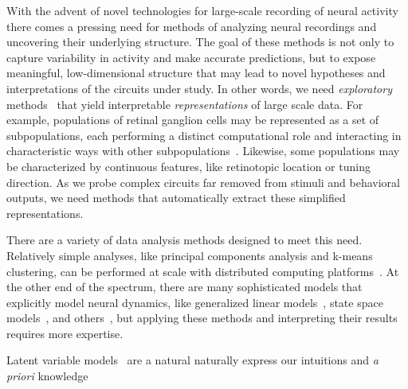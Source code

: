 With the advent of novel technologies for large-scale recording of
neural activity~\cite{grewe2010high, prevedel2014simultaneous,
  churchland2012neural, holekamp2008fast, ahrens2013whole,
  portugues2014whole, alivisatos2012brain, briggman2005optical,
  ahrens2012brain} there comes a pressing need for methods of
analyzing neural recordings and uncovering their underlying structure.
The goal of these methods is not only to capture variability in
activity and make accurate predictions, but to expose meaningful,
low-dimensional structure that may lead to novel hypotheses and
interpretations of the circuits under study. In other words, we
need \emph{exploratory} methods~\cite{tukey1962future} that yield interpretable
\emph{representations} of large scale data.  
For example, populations of retinal ganglion cells may be represented as a 
set of subpopulations, each performing a distinct
computational role and interacting in characteristic ways with
other subpopulations~\cite{sanes2015types}.
Likewise, some populations may be characterized by continuous features,
like retinotopic location or tuning direction.
As we probe complex circuits far removed from stimuli and behavioral
outputs, we need methods that automatically extract these simplified
representations.

There are a variety of data analysis methods designed to meet this
need.  Relatively simple analyses, like principal components analysis
and k-means clustering, can be performed at scale with distributed
computing platforms~\cite{freeman2014mapping}. At the other end of the
spectrum, there are many sophisticated models that explicitly model
neural dynamics, like generalized linear models~\cite{Truccolo-2005,
  Paninski-2004, Pillow-2008}, state space models~\cite{Smith-2003,
  paninski2010new, Buesing12, escola2011hidden,
  linderman2016nonparametric}, and others~\cite{Yu09,
  churchland2012neural, cunningham2007inferring},
but applying these methods and interpreting their results requires
more expertise. 


Latent variable models~\cite{blei2014build} are a natural 
naturally express our intuitions
and \textit{a priori} knowledge 

